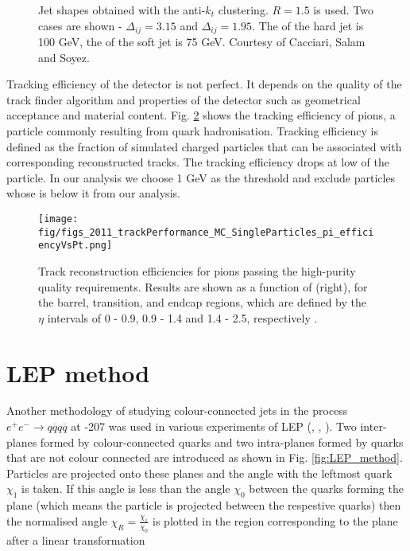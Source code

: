 \begin{figure}[hbtp]
  \def\twidth{0.5}
  \hfil
   \caption{Jet shapes obtained with the anti-$k_{t}$ clustering. $R=1.5$ is used. Two cases are shown - $\Delta_{ij}=3.15$ and  $\Delta_{ij}=1.95$. The \pt of the hard jet is 100 GeV, the \pt of the soft jet is 75 GeV. Courtesy of Cacciari, Salam and Soyez.}
  \label{fig:anti_kt}
\end{figure}

Tracking efficiency of the detector is not perfect. It depends on the quality of the track finder algorithm and properties of the detector such as geometrical acceptance and material content. Fig. \ref{fig:2011_trackPerformance_MC_SingleParticles_pi_efficiencyVsPt} shows the tracking efficiency of pions, a particle commonly resulting from quark hadronisation. Tracking efficiency is defined as the fraction of simulated charged particles that can be associated with corresponding reconstructed tracks. The tracking efficiency drops at low \pt of the particle. In our analysis we choose 1 GeV as the threshold and exclude particles whose \pt is below it from our analysis.

\begin{figure}[hbtp]
    \texttt{[image: fig/figs\_2011\_trackPerformance\_MC\_SingleParticles\_pi\_efficiencyVsPt.png]}
    \caption{Track reconstruction efficiencies for pions passing the high-purity quality requirements. Results are shown as a function of \pt (right), for the barrel, transition, and endcap regions, which are defined by the $\eta$ intervals of 0 - 0.9, 0.9 - 1.4 and 1.4 - 2.5, respectively \cite{Chatrchyan:2014fea}.}
    \label{fig:2011_trackPerformance_MC_SingleParticles_pi_efficiencyVsPt}
\end{figure}

\section{LEP method}

Another methodology of studying colour-connected jets in the process $e^{+}e^{-}\rightarrow q\overline{q}q\overline{q}$ at -207 \GeV was used in various experiments of LEP (\cite{Abdallah:2006uq}, \cite{Abbiendi:2005es}, \cite{Achard:2003pe}). Two inter-\PW planes formed by colour-connected quarks and two intra-\PW planes formed by quarks that are not colour connected are introduced as shown in Fig. \ref{fig:LEP_method}. Particles are projected onto these planes and the angle with the leftmost quark $\chi_{1}$ is taken. If this angle is less than the angle $\chi_{0}$ between the quarks forming the plane (which means the particle is projected between the respestive quarks) then the normalised angle $\chi_{R}=\frac{\chi_{1}}{\chi_{0}}$ is plotted in the region corresponding to the plane after a linear transformation

